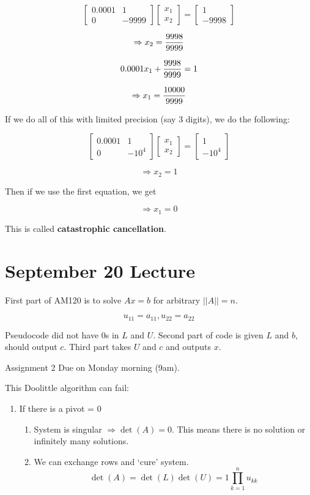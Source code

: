 \documentclass[12pt]{article}
\newcommand{\norm}[1]{\left|\left|#1\right|\right|}
\newcommand{\<}{\langle}
\renewcommand{\>}{\rangle}
\begin{document}
\[
	\begin{bmatrix}
		0.0001 & 1 \\ 0 & -9999
	\end{bmatrix}
	\begin{bmatrix}
		x_1 \\ x_2
	\end{bmatrix} = 
	\begin{bmatrix}
		1 \\ -9998
	\end{bmatrix}
\]

\[
	\Rightarrow x_2 = {9998 \over 9999}
\]

\[
	0.0001 x_1 + {9998 \over 9999} = 1
\]

\[
	\Rightarrow x_1= {10000 \over 9999}
\]

If we do all of this with limited precision (say 3 digits), we do the following:

\[
	\begin{bmatrix}
		0.0001 & 1 \\ 0 & -10^4
	\end{bmatrix}
	\begin{bmatrix}
		x_1 \\ x_2
	\end{bmatrix} = 
	\begin{bmatrix}
		1 \\ -10^4
	\end{bmatrix}
\]

\[
	\Rightarrow x_2 = 1
\]

Then if we use the first equation, we get

\[
	\Rightarrow x_1 = 0
\]

This is called \textbf{catastrophic cancellation}.

\section{September 20 Lecture}
First part of AM120 is to solve $Ax=b$ for arbitrary $\norm{A} = n$.

\[
	u_{11} = a_{11}, u_{22} = a_{22} 
\]

Pseudocode did not have 0s in $L$ and $U$. Second part of code is given $L$ and $b$, should output $c$. Third part takes $U$ and $c$ and outputs $x$.

Assignment 2 Due on Monday morning (9am).

This Doolittle algorithm can fail:
\begin{enumerate}
	\item If there is a pivot = 0
	\begin{enumerate}
		\item System is singular $\Rightarrow \det(A) = 0$. This means there is no solution or infinitely many solutions.
		\item We can exchange rows and `cure' system.
		\[
			\det(A) = \det(L) \det(U) = 1 \prod_{k=1}^n u_{kk}
		\]
	\end{enumerate}
\end{enumerate}
\end{document}
